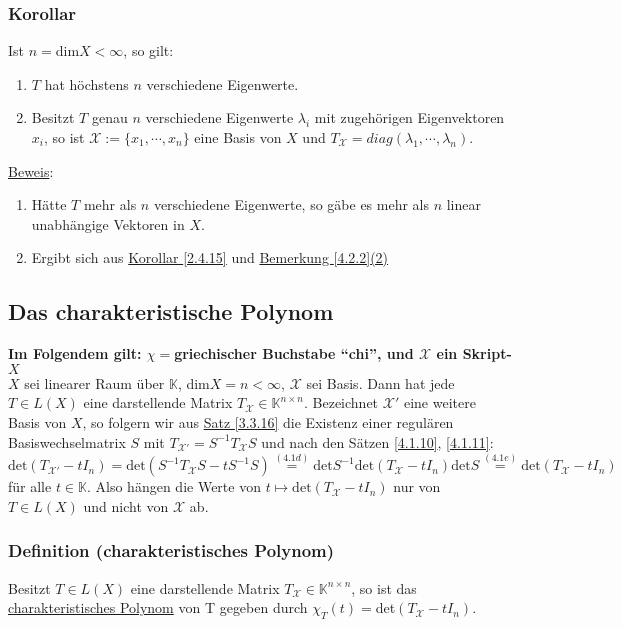 \subsubsection{Korollar}
Ist $n=$dim$X<\infty$, so gilt:
\renewcommand{\labelenumi}{(\alph{enumi})}
\begin{enumerate}
\item $T$ hat höchstens $n$ verschiedene Eigenwerte.
\item Besitzt $T$ genau $n$ verschiedene Eigenwerte $\lambda _i$ mit zugehörigen Eigenvektoren $x_i$, so ist $\mathcal{X}:=\{x_1,\cdots ,x_n\}$ eine Basis von $X$ und $T_\mathcal{X}=diag(\lambda _1,\cdots ,\lambda _n)$.
\end{enumerate}
\underline{Beweis}:
\begin{enumerate}
\item Hätte $T$ mehr als $n$ verschiedene Eigenwerte, so gäbe es mehr als $n$ linear unabhängige Vektoren in $X$.
\item Ergibt sich aus \hyperref[2.4.15]{Korollar \ref{2.4.15}} und \hyperref[4.2.2]{Bemerkung \ref{4.2.2}(2)}
\end{enumerate}
\subsection{Das charakteristische Polynom}
\textbf{Im Folgendem gilt: $\chi =$griechischer Buchstabe "`chi"', und $\mathcal{X}$ ein Skript-$X$\\}
$X$ sei linearer Raum über $\mathbb{K}$, dim$X=n<\infty$, $\mathcal{X}$ sei Basis.  Dann hat jede $T\in L(X)$ eine darstellende Matrix $T_\mathcal{X}\in \mathbb{K}^{n\times n}$.  Bezeichnet $\mathcal{X}'$ eine weitere Basis von $X$, so folgern wir aus \hyperref[3.3.16]{Satz \ref{3.3.16}} die Existenz einer regulären Basiswechselmatrix $S$ mit $T_{\mathcal{X}'}=S^{-1}T_\mathcal{X}S$ und nach den Sätzen \hyperref[4.1.10]{\ref{4.1.10}}, \hyperref[4.1.11]{\ref{4.1.11}}:
\[\mathrm{det}(T_{\mathcal{X}'}-tI_n)=\mathrm{det}(S^{-1}T_\mathcal{X}S-tS^{-1}S)\stackrel{\hyperref[4.1d]{(4.1d)}}{=}\mathrm{det}S^{-1}\mathrm{det}(T_\mathcal{X}-tI_n)\mathrm{det}S\stackrel{\hyperref[4.1e]{(4.1e)}}{=}\mathrm{det}(T_\mathcal{X}-tI_n)\]
für alle $t\in \mathbb{K}$.  Also hängen die Werte von $t\mapsto \mathrm{det}(T_\mathcal{X}-tI_n)$ nur von $T\in L(X)$ und nicht von $\mathcal{X}$ ab.
\subsubsection{Definition (charakteristisches Polynom)}
Besitzt $T\in L(X)$ eine darstellende Matrix $T_\mathcal{X}\in\mathbb{K}^{n\times n}$, so ist das \underline{charakteristisches Polynom} von T gegeben durch $\chi _T(t)=$det$(T_\mathcal{X}-tI_n)$.
